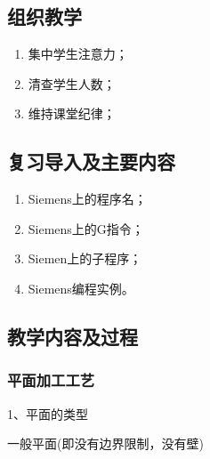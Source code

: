 \jxhj{%
	}

\makeshouye %

\subsection{组织教学}
\begin{enumerate}[\hspace{2em}1、]
	\item 集中学生注意力；
	\item 清查学生人数；
	\item 维持课堂纪律；
\end{enumerate}

\subsection{复习导入及主要内容}
\begin{enumerate}[1、]
\item Siemens上的程序名；
\item Siemens上的G指令；
\item Siemen上的子程序；
\item Siemens编程实例。
\end{enumerate}

\subsection{教学内容及过程}
\subsubsection{平面加工工艺}
1、平面的类型  

一般平面(即没有边界限制，没有壁)

